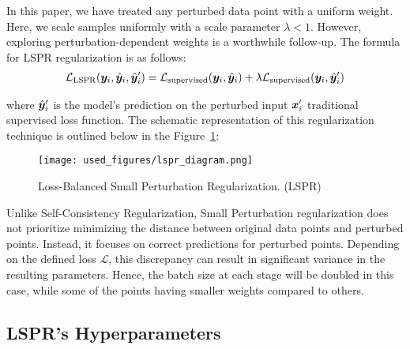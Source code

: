 In this paper, we have treated any perturbed data point with a uniform weight. Here, we scale samples uniformly with a scale parameter $\lambda<1$. 
However, exploring perturbation-dependent weights is a worthwhile follow-up.
The formula for LSPR regularization is as follows:
\begin{align}
\label{eq:spr}
    \mathcal{L_{\text{LSPR}}}({\bm{y}}_i,\hat{{\bm{y}}}_i, \hat{{\bm{y}}}'_i)   = \mathcal{L_{\text{supervised}}}({\bm{y}}_i,\hat{{\bm{y}}}_i) + \lambda \mathcal{L_{\text{supervised}}}({\bm{y}}_i,\hat{{\bm{y}}}'_i) 
\end{align}

where $\hat{{\bm{y}}}'_i$ is the model's prediction on the perturbed input ${\bm{x}}'_i$
traditional supervised loss function.
The schematic representation of this regularization technique is outlined below in the Figure~\ref{fig:lspr_diagram}:
\begin{figure}[h]
  \centering
  \texttt{[image: used\_figures/lspr\_diagram.png]}
  \caption{Loss-Balanced Small Perturbation Regularization. (LSPR)}
\label{fig:lspr_diagram}
\end{figure}
Unlike Self-Consistency Regularization, Small Perturbation regularization does not prioritize minimizing the distance between original data points and perturbed points. 
Instead, it focuses on correct predictions for perturbed points.
Depending on the defined loss $\mathcal{L}$, this discrepancy can result in significant variance in the resulting parameters.
Hence, the batch size at each stage will be doubled in this case, while some of the points having smaller weights compared to others.

\subsection{LSPR's Hyperparameters}

